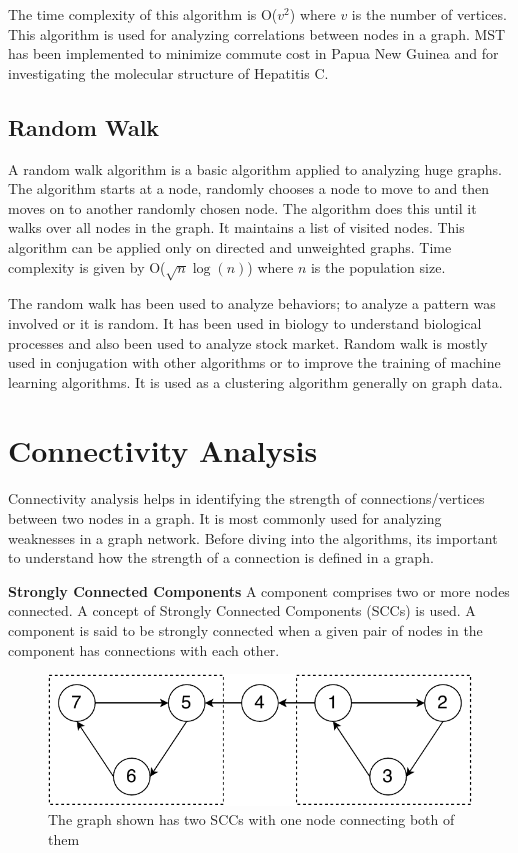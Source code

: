 \documentclass[journal,twoside,web]{ieeecolor}
\begin{document}
The time complexity of this algorithm is O($v^2$) where $v$ is the number of vertices. This algorithm is used for analyzing correlations between nodes in a graph. MST has been implemented to minimize commute cost in Papua New Guinea\cite{13} and for investigating the molecular structure of Hepatitis C\cite{50}.

\subsection{Random Walk}
A random walk algorithm is a basic algorithm applied to analyzing huge graphs. The algorithm starts at a node, randomly chooses a node to move to and then moves on to another randomly chosen node. The algorithm does this until it walks over all nodes in the graph. It maintains a list of visited nodes. This algorithm can be applied only on directed and unweighted graphs. Time complexity is given by O($\sqrt{n}\log(n)$) where $n$ is the population size.

The random walk has been used to analyze behaviors; to analyze a pattern was involved or it is random. It has been used in biology to understand biological processes\cite{51} and also been used to analyze stock market\cite{52}. Random walk is mostly used in conjugation with other algorithms\cite{53} or to improve the training of machine learning algorithms\cite{54}. It is used as a clustering algorithm generally on graph data.

\section{Connectivity Analysis}
\label{sec:connectivity}
Connectivity analysis helps in identifying the strength of connections/vertices between two nodes in a graph. It is most commonly used for analyzing weaknesses in a graph network. Before diving into the algorithms, its important to understand how the strength of a connection is defined in a graph.

\textbf{Strongly Connected Components}\label{sec:scc}
A component comprises two or more nodes connected. A concept of Strongly Connected Components (SCCs)\cite{39} is used. A component is said to be strongly connected when a given pair of nodes in the component has connections with each other.

\begin{figure}[!h]
    \centerline{\includegraphics[scale=0.75]{figures/scc.pdf}}
    \caption{The graph shown has two SCCs with one node connecting both of them}
    \label{fig4}
\end{figure}
\end{document}
